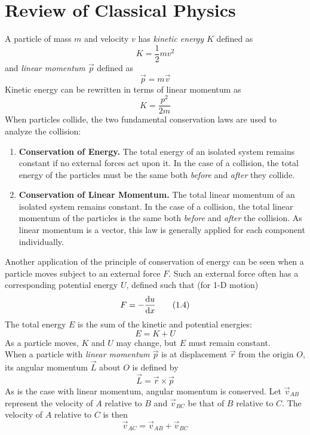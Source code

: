 \documentclass{subfiles}
\begin{document}
	\section{Review of Classical Physics}
			A particle of mass \(m\) and velocity \(v\) has \textit{kinetic energy \(K\)} defined as
				\[K = \frac{1}{2}mv^2 \tag{1.1}\]
				and \textit{linear momentum \(\vec{p}\)} defined as
				\[\vec{p} = m\vec{v} \tag{1.2}\]
				Kinetic energy can be rewritten in terms of linear momentum as
				\[K = \frac{p^2}{2m} \tag{1.3}\]
			When particles collide, the two fundamental conservation laws are used to analyze the collision:
				\begin{enumerate}
					\item
						\textbf{Conservation of Energy.} 
							The total energy of an isolated system remains constant if no external forces act upon it. In the case of a collision, the total energy of the particles must be the same both \textit{before} and \textit{after} they collide.
					\item
						\textbf{Conservation of Linear Momentum.}
							The total linear momentum of an isolated system remains constant. In the case of a collision, the total linear momentum of the particles is the same both \textit{before} and \textit{after} the collision. As linear momentum is a vector, this law is generally applied for each component individually.
				\end{enumerate}
			Another application of the principle of conservation of energy can be seen when a particle moves subject to an external force \(F\). Such an external force often has a corresponding potential energy \(U\), defined such that (for 1-D motion)
				\[F = -\dv{u}{x} \tag{1.4}\]
				The total energy \(E\) is the sum of the kinetic and potential energies:
				\[E = K + U \tag{1.5}\]
				As a particle moves, \(K\) and \(U\) may change, but \(E\) must remain constant. \\
			When a particle with \textit{linear momentum \(\vec{p}\)} is at displacement \(\vec{r}\) from the origin \(O\), its angular momentum \(\vec{L}\) about \(O\) is defined by
				\[\vec{L} = \vec{r} \times \vec{p} \tag{1.6}\]
				As is the case with linear momentum, angular momentum is conserved.
				Let \(\vec{v}_{AB}\) represent the velocity of \(A\) relative to \(B\) and \(\vec{v}_{BC}\) be that of \(B\) relative to \(C\). The velocity of \(A\) relative to \(C\) is then
					\[\vec{v}_{AC} = \vec{v}_{AB} + \vec{v}_{BC} \tag{1.7}\]
\end{document}
